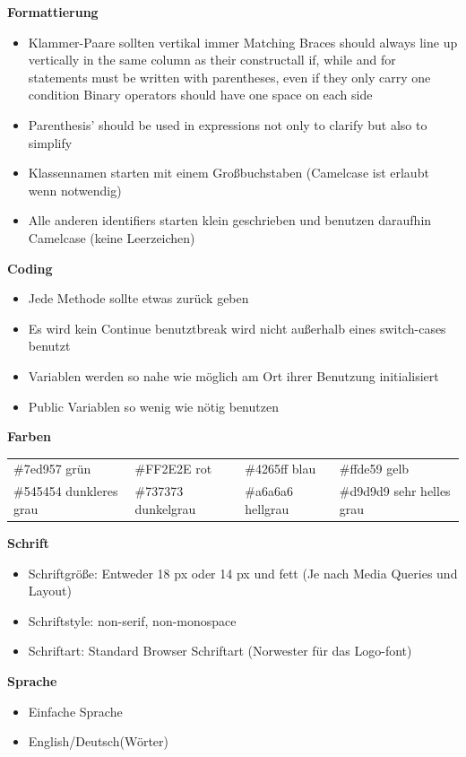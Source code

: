 \documentclass[11pt]{article}
\begin{document}
\textbf{Formattierung}
\begin{itemize}
\item Klammer-Paare sollten vertikal immer Matching Braces should always line up vertically in the same column as their constructall if, while and for statements must be written with parentheses, even if they only carry one condition
Binary operators should have one space on each side
\item Parenthesis' should be used in expressions not only to clarify but also to simplify
\item Klassennamen starten mit einem Großbuchstaben (Camelcase ist erlaubt wenn notwendig)
\item Alle anderen identifiers starten klein geschrieben und benutzen daraufhin Camelcase (keine Leerzeichen)\\
\end{itemize}

\textbf{Coding}
\begin{itemize}
\item Jede Methode sollte etwas zurück geben
\item Es wird kein Continue benutztbreak wird nicht außerhalb eines switch-cases benutzt
\item Variablen werden so nahe wie möglich am Ort ihrer Benutzung initialisiert
\item Public Variablen so wenig wie nötig benutzen\\
\end{itemize}

\textbf{Farben}

\begin{tabular}{llll}
\#7ed957    grün & \#FF2E2E    rot & \#4265ff    blau & \#ffde59    gelb \\
\#545454    dunkleres grau & \#737373    dunkelgrau & \#a6a6a6    hellgrau & \#d9d9d9    sehr helles grau\\
\end{tabular}
\pagebreak

\begin{large}\textbf{Schrift}\end{large}
\begin{itemize}
\item Schriftgröße: Entweder 18 px oder 14 px und fett (Je nach Media Queries und Layout)
\item Schriftstyle: non-serif, non-monospace
\item Schriftart: Standard Browser Schriftart (Norwester für das Logo-font)\\
\end{itemize}

\textbf{Sprache}
\begin{itemize}
\item Einfache Sprache
\item English/Deutsch(Wörter)\\
\end{itemize}

\pagebreak
\printbibliography
\end{document}
